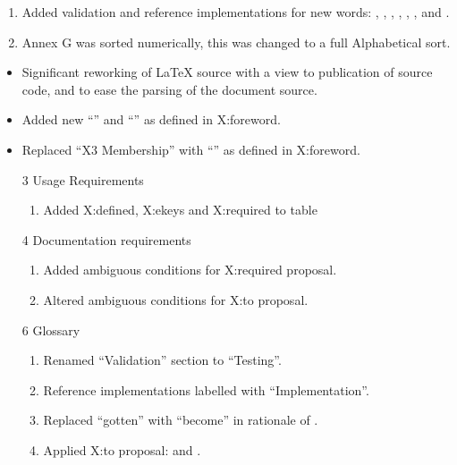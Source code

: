 	\begin{enumerate}
	\item Added validation and reference implementations for new words:
		,
		,
		,
		,
		,
		,
		 and
		.

	\item Annex G was sorted numerically, this was changed to a full
		Alphabetical sort.
	\end{enumerate}

	\begin{itemize}
	\item Significant reworking of \LaTeX{} source with a view to
		publication of source code, and to ease the parsing of the
		document source.

	\item Added new ``'' and ``'' as defined
		in \textsf{X:foreword}.

	\item Replaced ``X3 Membership'' with ``'' as
		defined in \textsf{X:foreword}.

	\item[3] Usage Requirements
		\begin{enumerate}
		\item Added
			\textsf{X:defined},
			\textsf{X:ekeys} and
			\textsf{X:required}
			to table 
		\end{enumerate}

	\item[4] Documentation requirements
		\begin{enumerate}
		\item Added ambiguous conditions for \textsf{X:required} proposal.
		\item Altered ambiguous conditions for \textsf{X:to} proposal.
		\end{enumerate}

	\item[6] Glossary
		\begin{enumerate}
		\item Renamed ``Validation'' section to ``Testing''.
		\item Reference implementations labelled with ``Implementation''.
		\item Replaced ``gotten'' with ``become'' in rationale of
			.
		\item Applied \textsf{X:to} proposal:
			 and .
		\end{enumerate}


\end{itemize}
